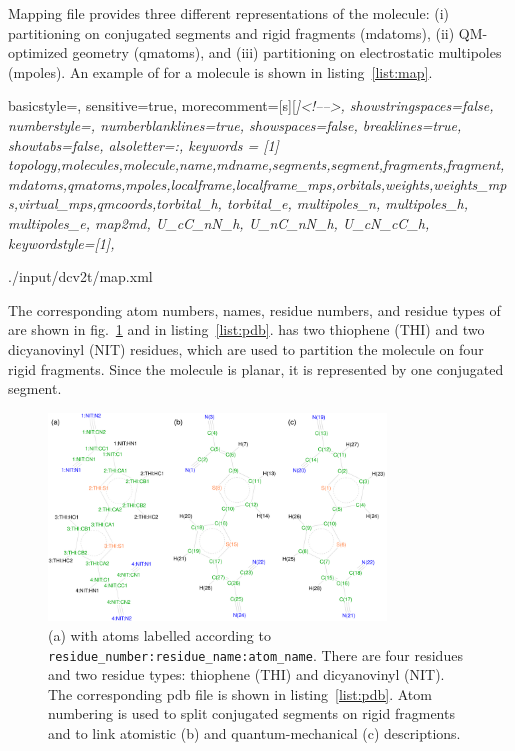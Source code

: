 
Mapping file provides three different representations of the molecule: (i) partitioning on conjugated segments and rigid fragments (mdatoms), (ii) QM-optimized geometry (qmatoms), and (iii) partitioning on electrostatic multipoles (mpoles). An example of \xmlcsg for a \dcvt molecule is shown in listing~\ref{list:map}. 

 {
   basicstyle=\ttfamily\tiny,
   sensitive=true,
   morecomment=[s][\color{gray}\rmfamily\itshape]{<!--}{-->}, 
   showstringspaces=false,
   numberstyle=\tiny,
   numberblanklines=true,
   showspaces=false,
   breaklines=true,
   showtabs=false,
   alsoletter={:},
   keywords = [1]
   { topology,molecules,molecule,name,mdname,segments,segment,fragments,fragment,mdatoms,qmatoms,mpoles,localframe,localframe_mps,orbitals,weights,weights_mps,virtual_mps,qmcoords,torbital_h, torbital_e, multipoles_n, multipoles_h, multipoles_e, map2md, U_cC_nN_h, U_nC_nN_h, U_cN_cC_h},
   keywordstyle={[1]\color{blue}},
}

\newpage
%
{./input/dcv2t/map.xml}
\vfill

The corresponding atom numbers, names, residue numbers, and residue types of  \dcvt are shown in fig.~\ref{fig:dcv2t} and in listing~\ref{list:pdb}. \dcvt has two thiophene (THI) and two dicyanovinyl (NIT) residues, which are used to partition the molecule on four rigid fragments. Since the molecule is planar, it is represented by one conjugated segment.

\newpage
\begin{figure}[ht]
\centering
\includegraphics[width=0.8\textwidth]{./fig/dcv2t}
\caption{\small (a) \dcvt with atoms labelled according to \texttt{residue\_number:residue\_name:atom\_name}. 
There are four residues and two residue types: thiophene (THI) and dicyanovinyl (NIT). The corresponding pdb file is shown in listing~\ref{list:pdb}. Atom numbering is used to split conjugated segments on rigid fragments and to link atomistic (b) and quantum-mechanical (c) descriptions.}
\label{fig:dcv2t}
\end{figure}

